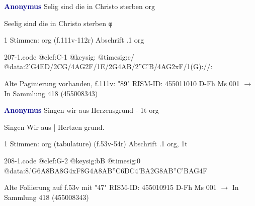 \documentclass[twocolumn]{book}
\begin{document}
\newline \par \vspace{7pt} \textcolor{darkblue}{\textbf{Anonymus  }}
\newline Selig sind die in Christo sterben
\newline org
\newline \begin{itshape} Seelig sind die in Christo sterben φ\end{itshape} 
\newline \textcolor{darkblue}{}  1 Stimmen: org  (f.111v-112r)
\newline Abschrift
.1  org  
\begin{filecontents*}{207-1.code}
@clef:C-1
@keysig:
@timesig:c/
@data:2'G4ED/2CG/4AG2F/1E/2G4AB/2''C'B/4AG2xF/1(G)://:
\end{filecontents*}
\newline
%
\newline Alte Paginierung vorhanden, f.111v: "89"
\newline RISM-ID: 455011010
\newline D-Fh  Ms 001
\newline $\rightarrow$ In Sammlung 418 (455008343)
      
\newline \par \vspace{7pt} \textcolor{darkblue}{\textbf{Anonymus  }}
\newline Singen wir aus Herzensgrund - 1t
\newline org
\newline \begin{itshape}[f.53v, at left:] Singen Wir aus | Hertzen grund.\end{itshape} 
\newline \textcolor{darkblue}{}  1 Stimmen: org (tabulature)  (f.53v-54r)
\newline Abschrift
.1  org, 1t  
\begin{filecontents*}{208-1.code}
@clef:G-2
@keysig:bB
@timesig:0
@data:8.'G6A{8BA}8G4xF8G4A{8AB''C6DC}4'BA2G{8AB''C'B}{AG}4F
\end{filecontents*}
\newline
%
\newline Alte Foliierung auf f.53v mit "47"
\newline RISM-ID: 455010915
\newline D-Fh  Ms 001
\newline $\rightarrow$ In Sammlung 418 (455008343)
      
\end{document}
